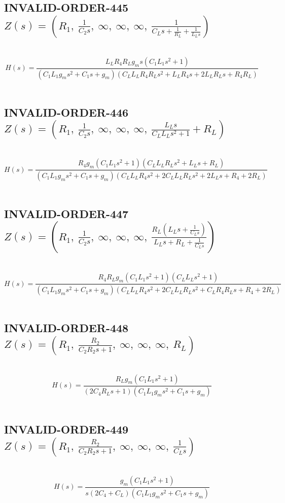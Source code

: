 \documentclass{article}
\begin{document}
\subsection{INVALID-ORDER-445 $Z(s) = \left( R_{1}, \  \frac{1}{C_{2} s}, \  \infty, \  \infty, \  \infty, \  \frac{1}{C_{L} s + \frac{1}{R_{L}} + \frac{1}{L_{L} s}}\right)$ } \ 
\textbf{\[H(s) = \frac{L_{L} R_{4} R_{L} g_{m} s \left(C_{1} L_{1} s^{2} + 1\right)}{\left(C_{1} L_{1} g_{m} s^{2} + C_{1} s + g_{m}\right) \left(C_{L} L_{L} R_{4} R_{L} s^{2} + L_{L} R_{4} s + 2 L_{L} R_{L} s + R_{4} R_{L}\right)}\] } \ 
\subsection{INVALID-ORDER-446 $Z(s) = \left( R_{1}, \  \frac{1}{C_{2} s}, \  \infty, \  \infty, \  \infty, \  \frac{L_{L} s}{C_{L} L_{L} s^{2} + 1} + R_{L}\right)$ } \ 
\textbf{\[H(s) = \frac{R_{4} g_{m} \left(C_{1} L_{1} s^{2} + 1\right) \left(C_{L} L_{L} R_{L} s^{2} + L_{L} s + R_{L}\right)}{\left(C_{1} L_{1} g_{m} s^{2} + C_{1} s + g_{m}\right) \left(C_{L} L_{L} R_{4} s^{2} + 2 C_{L} L_{L} R_{L} s^{2} + 2 L_{L} s + R_{4} + 2 R_{L}\right)}\] } \ 
\subsection{INVALID-ORDER-447 $Z(s) = \left( R_{1}, \  \frac{1}{C_{2} s}, \  \infty, \  \infty, \  \infty, \  \frac{R_{L} \left(L_{L} s + \frac{1}{C_{L} s}\right)}{L_{L} s + R_{L} + \frac{1}{C_{L} s}}\right)$ } \ 
\textbf{\[H(s) = \frac{R_{4} R_{L} g_{m} \left(C_{1} L_{1} s^{2} + 1\right) \left(C_{L} L_{L} s^{2} + 1\right)}{\left(C_{1} L_{1} g_{m} s^{2} + C_{1} s + g_{m}\right) \left(C_{L} L_{L} R_{4} s^{2} + 2 C_{L} L_{L} R_{L} s^{2} + C_{L} R_{4} R_{L} s + R_{4} + 2 R_{L}\right)}\] } \ 
\subsection{INVALID-ORDER-448 $Z(s) = \left( R_{1}, \  \frac{R_{2}}{C_{2} R_{2} s + 1}, \  \infty, \  \infty, \  \infty, \  R_{L}\right)$ } \ 
\textbf{\[H(s) = \frac{R_{L} g_{m} \left(C_{1} L_{1} s^{2} + 1\right)}{\left(2 C_{4} R_{L} s + 1\right) \left(C_{1} L_{1} g_{m} s^{2} + C_{1} s + g_{m}\right)}\] } \ 
\subsection{INVALID-ORDER-449 $Z(s) = \left( R_{1}, \  \frac{R_{2}}{C_{2} R_{2} s + 1}, \  \infty, \  \infty, \  \infty, \  \frac{1}{C_{L} s}\right)$ } \ 
\textbf{\[H(s) = \frac{g_{m} \left(C_{1} L_{1} s^{2} + 1\right)}{s \left(2 C_{4} + C_{L}\right) \left(C_{1} L_{1} g_{m} s^{2} + C_{1} s + g_{m}\right)}\] } \ 
\end{document}
